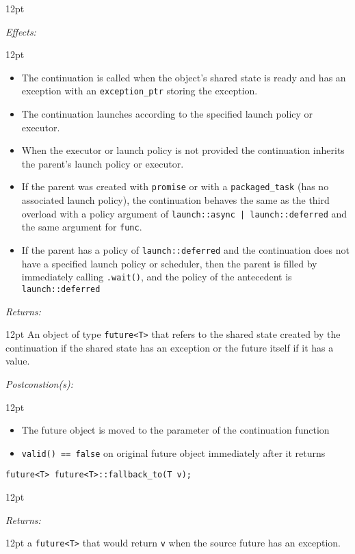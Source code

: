\documentclass[a4paper,10pt]{article}
\newcommand{\cpp}[1]{\lstinline{#1}}
\newcommand{\wordingItem}[1]{\noindent\textit{#1:}}
\newenvironment{wordingPara}{\begin{adjustwidth}{12pt}{}}{\end{adjustwidth}}
\newenvironment{Effects}{\wordingItem{Effects}\vspace{7pt}\noindent\begin{adjustwidth}{12pt}{}}{\vspace{7pt}\end{adjustwidth}}
\newenvironment{Returns}{\wordingItem{Returns}\vspace{7pt}\noindent\begin{adjustwidth}{12pt}{}}{\vspace{7pt}\end{adjustwidth}}
\newenvironment{Postconditions}{\wordingItem{Postconstion(s)}\vspace{7pt}\noindent\begin{adjustwidth}{12pt}{}}{\vspace{7pt}\end{adjustwidth}}
\begin{document}
\begin{wordingPara}

\begin{Effects}
\begin{itemize}
\item The continuation is called when the object's shared state is ready and has an exception with an \cpp{exception_ptr} storing the exception. 
\item The continuation launches according to the specified launch policy or executor. 
\item When the executor or launch policy is not provided the continuation inherits the parent's 
launch policy or executor. 
\item If the parent was created with \cpp{promise} or with a \cpp{packaged_task} (has no associated launch 
policy), the continuation behaves the same as the third overload with a policy argument of 
\cpp{launch::async | launch::deferred} and the same argument for \cpp{func}. 
\item If the parent has a policy of \cpp{launch::deferred} and the continuation does not have a specified 
launch policy or scheduler, then the parent is filled by immediately calling \cpp{.wait()}, and the 
policy of the antecedent is\cpp{ launch::deferred}
\end{itemize}
\end{Effects}
 
\begin{Returns}
An object of type \cpp{future<T>} that refers to the shared state created by 
the continuation if the shared state has an exception or the future itself if it has a value. 
\end{Returns}

\begin{Postconditions}
\begin{itemize}
\item The future object is moved to the parameter of the continuation function 
\item \cpp{valid() == false} on original future object immediately after it returns
\end{itemize}
\end{Postconditions}

\end{wordingPara}
\begin{lstlisting}[xleftmargin=0pt]
future<T> future<T>::fallback_to(T v);
\end{lstlisting}
\begin{wordingPara}

\begin{Returns}
a \cpp{future<T>} that would return \cpp{v} when the source future has an exception.
\end{Returns}

\end{wordingPara}
\end{document}
